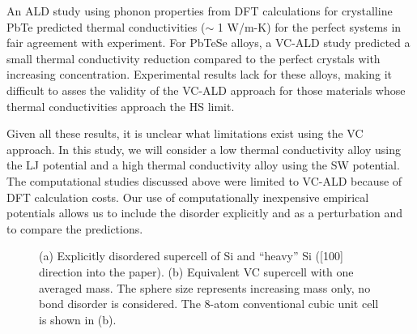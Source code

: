\documentclass[aps,prb,onecolumn,preprint,footinbib,superscriptaddress,amsmath,amssymb,floatfix]{revtex4}
\begin{document}
An ALD study using phonon properties from DFT calculations for 
crystalline PbTe\cite{shiga_microscopic_2012} predicted 
thermal conductivities ($\sim$ 1 W/m-K) for the perfect systems 
in fair agreement with experiment. For PbTeSe alloys, a VC-ALD 
study predicted a small thermal conductivity reduction compared to the 
perfect crystals with increasing 
concentration.\cite{tian_phonon_2012} Experimental results lack for 
these alloys,\cite{kudman_thermoelectric_1972,pei_convergence_2011} 
making it difficult to asses the validity of the VC-ALD approach for 
those materials whose thermal conductivities approach the HS limit.
\cite{koh_lattice_2009} 

Given all these results, it is unclear what limitations exist 
using the VC approach. 
In this study, we will consider a low thermal conductivity alloy  
using the LJ potential and a high thermal conductivity alloy using the 
SW potential. The computational studies discussed above were 
limited to VC-ALD 
because of DFT calculation costs. Our use of computationally 
inexpensive empirical potentials allows us to include the disorder 
explicitly and as a perturbation and to compare the predictions. 


\begin{figure}
\begin{center}
\mbox{}
\vspace*{0mm}
\end{center}
\caption{\label{F:supercells} 
(a) Explicitly disordered supercell of 
Si and ``heavy'' Si ([100] direction into the paper).
\cite{momma_vesta:_2008} 
(b) Equivalent VC supercell with one averaged mass. 
The sphere size represents increasing mass only, no bond disorder 
is considered. The 8-atom conventional cubic unit cell is shown 
in (b). 
}
\end{figure}
\end{document}
